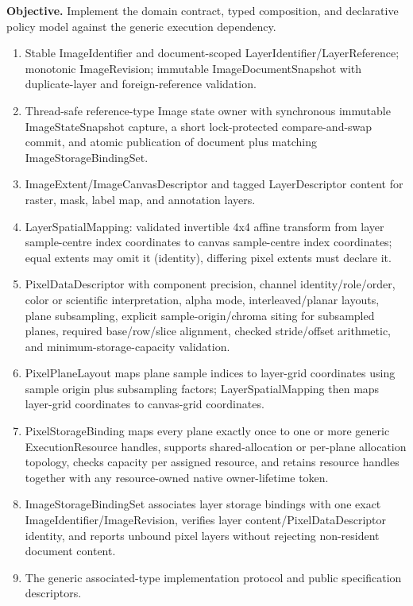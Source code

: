 
\textbf{Objective.} Implement the domain contract, typed composition, and declarative policy model against the generic execution dependency.

\deliverables
\begin{enumerate}
  \item Stable ImageIdentifier and document-scoped LayerIdentifier/LayerReference; monotonic ImageRevision; immutable ImageDocumentSnapshot with duplicate-layer and foreign-reference validation.
  \item Thread-safe reference-type Image state owner with synchronous immutable ImageStateSnapshot capture, a short lock-protected compare-and-swap commit, and atomic publication of document plus matching ImageStorageBindingSet.
  \item ImageExtent/ImageCanvasDescriptor and tagged LayerDescriptor content for raster, mask, label map, and annotation layers.
  \item LayerSpatialMapping: validated invertible 4x4 affine transform from layer sample-centre index coordinates to canvas sample-centre index coordinates; equal extents may omit it (identity), differing pixel extents must declare it.
  \item PixelDataDescriptor with component precision, channel identity/role/order, color or scientific interpretation, alpha mode, interleaved/planar layouts, plane subsampling, explicit sample-origin/chroma siting for subsampled planes, required base/row/slice alignment, checked stride/offset arithmetic, and minimum-storage-capacity validation.
  \item PixelPlaneLayout maps plane sample indices to layer-grid coordinates using sample origin plus subsampling factors; LayerSpatialMapping then maps layer-grid coordinates to canvas-grid coordinates.
  \item PixelStorageBinding maps every plane exactly once to one or more generic ExecutionResource handles, supports shared-allocation or per-plane allocation topology, checks capacity per assigned resource, and retains resource handles together with any resource-owned native owner-lifetime token.
  \item ImageStorageBindingSet associates layer storage bindings with one exact ImageIdentifier/ImageRevision, verifies layer content/PixelDataDescriptor identity, and reports unbound pixel layers without rejecting non-resident document content.
  \item The generic associated-type implementation protocol and public specification descriptors.

\end{enumerate}
